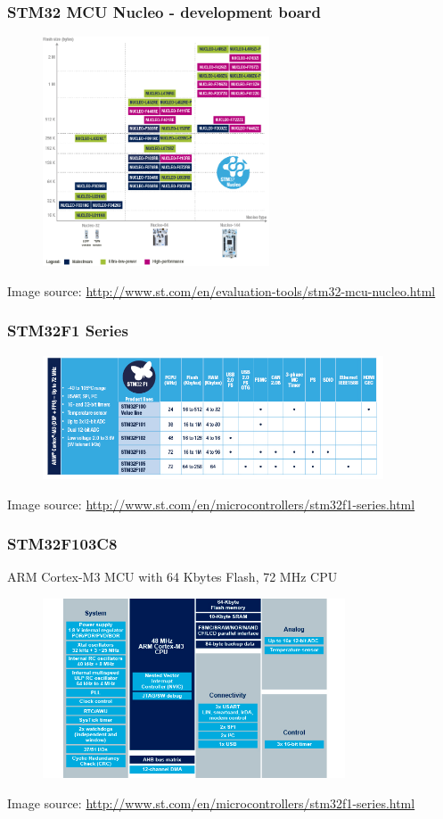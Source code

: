 \documentclass[12;pt,t]{beamer} %
\newcommand{\srctext}[1]{{\fontsize{7}{9}\selectfont\textcolor{sourcesclr}{#1}}}
\begin{document}
\begin{frame}
\frametitle{STM32 MCU Nucleo - development board}
	\begin{figure}[H]
		\includegraphics[width=0.6\textwidth]{img/ln1847_stm32_nucleo.jpg}
	\end{figure}
	\srctext{Image source: \url{http://www.st.com/en/evaluation-tools/stm32-mcu-nucleo.html}}
\end{frame}

\begin{frame}
\frametitle{STM32F1 Series}
	\begin{figure}[H]
		\includegraphics[width=0.9\textwidth]{img/STM32F1_series_SS1031.jpg}
	\end{figure}
	\srctext{Image source: \url{http://www.st.com/en/microcontrollers/stm32f1-series.html}}
\end{frame}

\begin{frame}
\frametitle{STM32F103C8}
	ARM Cortex-M3 MCU with 64 Kbytes Flash, 72 MHz CPU
	\begin{figure}[H]
		\includegraphics[width=0.8\textwidth]{img/bd_stm32f102x8_64k.jpg}
	\end{figure}
	\srctext{Image source: \url{http://www.st.com/en/microcontrollers/stm32f1-series.html}}
\end{frame}
\end{document}
